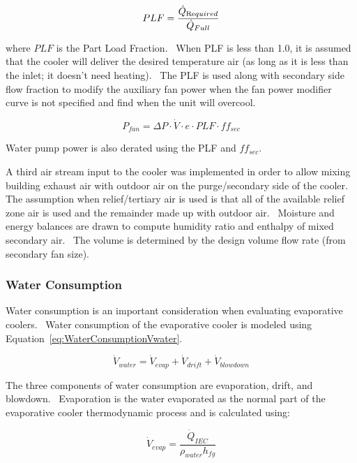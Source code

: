 \begin{equation}
PLF = \frac{{{{\dot Q}_{{\mathop{\rm Re}\nolimits} quired}}}}{{{{\dot Q}_{Full}}}}
\end{equation}

where \(PLF\) is the Part Load Fraction.~ When PLF is less than 1.0, it is assumed that the cooler will deliver the desired temperature air (as long as it is less than the inlet; it doesn't need heating).~ The PLF is used along with secondary side flow fraction to modify the auxiliary fan power when the fan power modifier curve is not specified and find when the unit will overcool.

\begin{equation}
{P_{fan}} = \Delta P\cdot \dot V\cdot e\cdot PLF\cdot ff_{sec}
\end{equation}

Water pump power is also derated using the PLF and \(ff_{sec}\).

A third air stream input to the cooler was implemented in order to allow mixing building exhaust air with outdoor air on the purge/secondary side of the cooler. The assumption when relief/tertiary air is used is that all of the available relief zone air is used and the remainder made up with outdoor air.~ Moisture and energy balances are drawn to compute humidity ratio and enthalpy of mixed secondary air.~ The volume is determined by the design volume flow rate (from secondary fan size).

\subsubsection{Water Consumption}\label{water-consumption}

Water consumption is an important consideration when evaluating evaporative coolers.~ Water consumption of the evaporative cooler is modeled using Equation~\ref{eq:WaterConsumptionVwater}.

\begin{equation}
{\dot V_{water}} = {\dot V_{evap}} + {\dot V_{drift}} + {\dot V_{blowdown}}
\label{eq:WaterConsumptionVwater}
\end{equation}

The three components of water consumption are evaporation, drift, and blowdown.~ Evaporation is the water evaporated as the normal part of the evaporative cooler thermodynamic process and is calculated using:

\begin{equation}
{\dot V_{evap}} = \frac{{{{\dot Q}_{IEC}}}}{{{\rho_{water}}{h_{fg}}}}
\end{equation}

